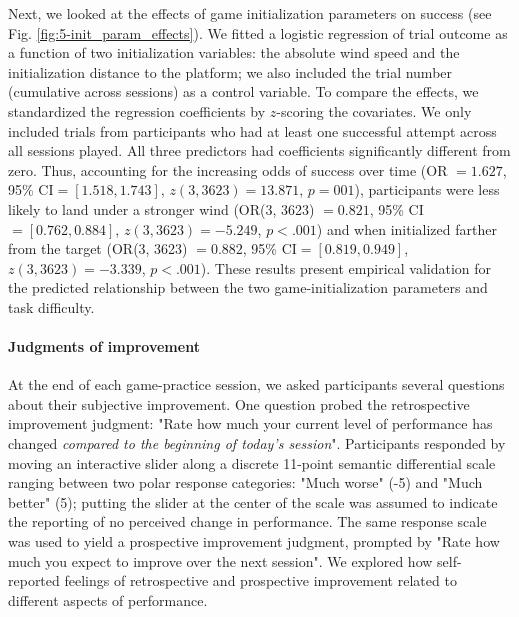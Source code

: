 Next, we looked at the effects of game initialization parameters on success (see Fig. \ref{fig:5-init_param_effects}). We fitted a logistic regression of trial outcome as a function of two initialization variables: the absolute wind speed and the initialization distance to the platform; we also included the trial number (cumulative across sessions) as a control variable. To compare the effects, we standardized the regression coefficients by $z$-scoring the covariates. We only included trials from participants who had at least one successful attempt across all sessions played. All three predictors had coefficients significantly different from zero. Thus, accounting for the increasing odds of success over time (\ac{OR} $=1.627$, 95\% \ac{CI}$=[1.518, 1.743]$, $z(3, 3623) = 13.871$, $p = 001$), participants were less likely to land under a stronger wind (\ac{OR}(3, 3623) $=0.821$, 95\% \ac{CI}$=[0.762, 0.884]$, $z(3, 3623) = -5.249$, $p<.001$) and when initialized farther from the target (\ac{OR}(3, 3623) $=0.882$, 95\% \ac{CI}$=[0.819, 0.949]$, $z(3, 3623) = -3.339$, $p<.001$). These results present empirical validation for the predicted relationship between the two game-initialization parameters and task difficulty.

\paragraph{Judgments of improvement}

At the end of each game-practice session, we asked participants several questions about their subjective improvement. One question probed the retrospective improvement judgment: "Rate how much your current level of performance has changed \textit{compared to the beginning of today's session}". Participants responded by moving an interactive slider along a discrete 11-point semantic differential scale ranging between two polar response categories: "Much worse" (-5) and "Much better" (5); putting the slider at the center of the scale was assumed to indicate the reporting of no perceived change in performance. The same response scale was used to yield a prospective improvement judgment, prompted by "Rate how much you expect to improve over the next session". We explored how self-reported feelings of retrospective and prospective improvement related to different aspects of performance.

